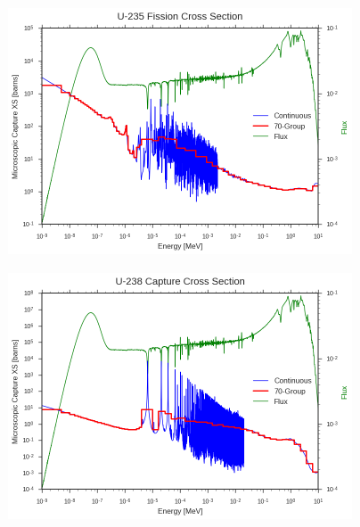 \begin{figure}
\begin{subfigure}{.5\textwidth}
  \centering
  \includegraphics[width=\linewidth]{figures/intro/u235-fission-70}
  \caption{}
  \label{fig:assm-cells}
\end{subfigure}%
\begin{subfigure}{.5\textwidth}
  \centering
  \includegraphics[width=\linewidth]{figures/intro/u238-capture-70}
  \caption{}
  \label{fig:colorset-cells}
\end{subfigure}
\begin{subfigure}{.5\textwidth}
  \centering

\end{subfigure}
\end{figure}
